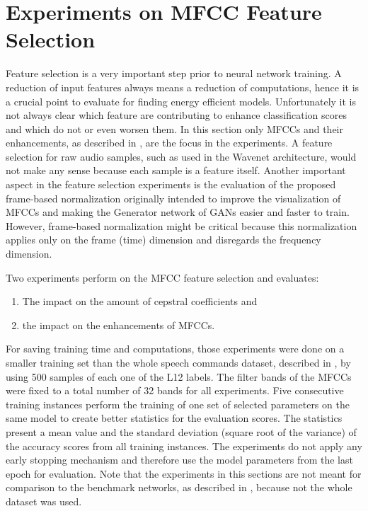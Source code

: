 
\section{Experiments on MFCC Feature Selection}\label{sec:exp_fs}
Feature selection is a very important step prior to neural network training.
A reduction of input features always means a reduction of computations, hence it is a crucial point to evaluate for finding energy efficient models.
Unfortunately it is not always clear which feature are contributing to enhance classification scores and which do not or even worsen them.
In this section only MFCCs and their enhancements, as described in , are the focus in the experiments.
A feature selection for raw audio samples, such as used in the Wavenet architecture, would not make any sense because each sample is a feature itself.
Another important aspect in the feature selection experiments is the evaluation of the proposed frame-based normalization  originally intended to improve the visualization of MFCCs and making the Generator network of GANs easier and faster to train.
However, frame-based normalization might be critical because this normalization applies only on the frame (time) dimension and disregards the frequency dimension.

Two experiments perform on the MFCC feature selection and evaluates:
\begin{enumerate}
    \item The impact on the amount of cepstral coefficients and
    \item the impact on the enhancements of MFCCs.
\end{enumerate}
For saving training time and computations, those experiments were done on a smaller training set than the whole speech commands dataset, described in , by using 500 samples of each one of the L12 labels.
The filter bands of the MFCCs were fixed to a total number of 32 bands for all experiments.
Five consecutive training instances perform the training of one set of selected parameters on the same model to create better statistics for the evaluation scores.
The statistics present a mean value and the standard deviation (square root of the variance) of the accuracy scores from all training instances.
The experiments do not apply any early stopping mechanism and therefore use the model parameters from the last epoch for evaluation.
Note that the experiments in this sections are not meant for comparison to the benchmark networks, as described in , because not the whole dataset was used.


